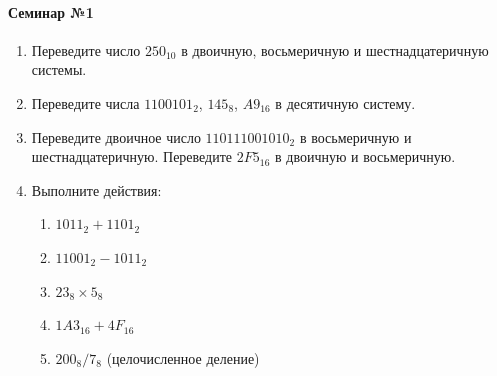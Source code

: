 \documentclass[a4paper,14pt]{report}
\begin{document}
\paragraph{Семинар №1}
\begin{enumerate}
    \item Переведите число $250_{10}$ в двоичную, восьмеричную и шестнадцатеричную системы.
    \item Переведите числа $1100101_2$, $145_8$, $A9_{16}$ в десятичную систему.
    \item Переведите двоичное число $110111001010_2$ в восьмеричную и шестнадцатеричную. Переведите $2F5_{16}$ в двоичную и восьмеричную.
    \item Выполните действия:
    \begin{enumerate}
        \item $1011_2 + 1101_2$
        \item $11001_2 - 1011_2$
        \item $23_8 \times 5_8$
        \item $1A3_{16} + 4F_{16}$
        \item $200_8 / 7_8$ (целочисленное деление)
    \end{enumerate}
\end{enumerate}
\end{document}
